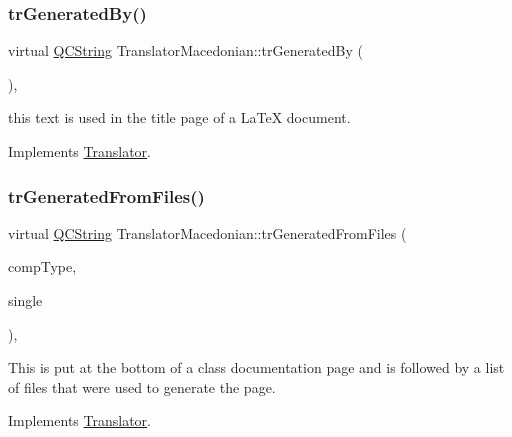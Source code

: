 \mbox{\label{class_translator_macedonian_a9344d108b0ce4e81003e2c574756da67}} 
\subsubsection{\texorpdfstring{trGeneratedBy()}{trGeneratedBy()}}
{\footnotesize\ttfamily virtual \mbox{\hyperlink{class_q_c_string}{Q\+C\+String}} Translator\+Macedonian\+::tr\+Generated\+By (\begin{DoxyParamCaption}{ }\end{DoxyParamCaption})\hspace{0.3cm}{\ttfamily [inline]}, {\ttfamily [virtual]}}

this text is used in the title page of a La\+TeX document. 

Implements \mbox{\hyperlink{class_translator}{Translator}}.

\mbox{\label{class_translator_macedonian_ab27ad0e4458a3b91dc1366a58c08a73e}} 
\subsubsection{\texorpdfstring{trGeneratedFromFiles()}{trGeneratedFromFiles()}}
{\footnotesize\ttfamily virtual \mbox{\hyperlink{class_q_c_string}{Q\+C\+String}} Translator\+Macedonian\+::tr\+Generated\+From\+Files (\begin{DoxyParamCaption}\item[{\mbox{\hyperlink{class_class_def_ae70cf86d35fe954a94c566fbcfc87939}{Class\+Def\+::\+Compound\+Type}}}]{comp\+Type,  }\item[{bool}]{single }\end{DoxyParamCaption})\hspace{0.3cm}{\ttfamily [inline]}, {\ttfamily [virtual]}}

This is put at the bottom of a class documentation page and is followed by a list of files that were used to generate the page. 

Implements \mbox{\hyperlink{class_translator}{Translator}}.

